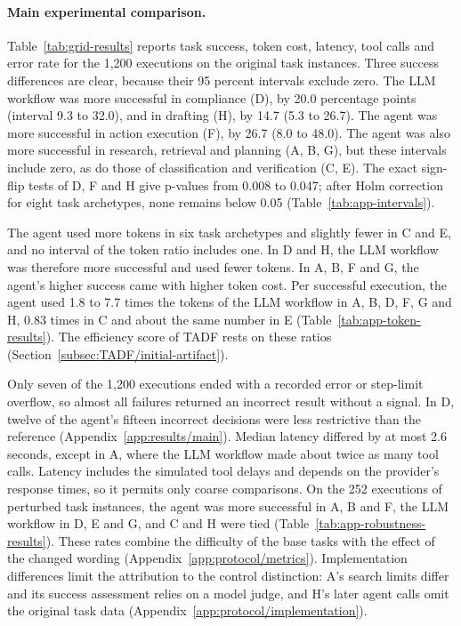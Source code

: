 \paragraph{Main experimental comparison.}
Table~\ref{tab:grid-results} reports task success, token cost, latency, tool calls and error rate for the 1,200 executions on the original task instances. Three success differences are clear, because their 95 percent intervals exclude zero. The LLM workflow was more successful in compliance (D), by 20.0 percentage points (interval 9.3 to 32.0), and in drafting (H), by 14.7 (5.3 to 26.7). The agent was more successful in action execution (F), by 26.7 (8.0 to 48.0). The agent was also more successful in research, retrieval and planning (A, B, G), but these intervals include zero, as do those of classification and verification (C, E). The exact sign-flip tests of D, F and H give p-values from 0.008 to 0.047; after Holm correction for eight task archetypes, none remains below 0.05 (Table~\ref{tab:app-intervals}).

The agent used more tokens in six task archetypes and slightly fewer in C and E, and no interval of the token ratio includes one. In D and H, the LLM workflow was therefore more successful and used fewer tokens. In A, B, F and G, the agent's higher success came with higher token cost. Per successful execution, the agent used 1.8 to 7.7 times the tokens of the LLM workflow in A, B, D, F, G and H, 0.83 times in C and about the same number in E (Table~\ref{tab:app-token-results}). The efficiency score of TADF rests on these ratios (Section~\ref{subsec:TADF/initial-artifact}).

Only seven of the 1,200 executions ended with a recorded error or step-limit overflow, so almost all failures returned an incorrect result without a signal. In D, twelve of the agent's fifteen incorrect decisions were less restrictive than the reference (Appendix~\ref{app:results/main}). Median latency differed by at most 2.6 seconds, except in A, where the LLM workflow made about twice as many tool calls. Latency includes the simulated tool delays and depends on the provider's response times, so it permits only coarse comparisons. On the 252 executions of perturbed task instances, the agent was more successful in A, B and F, the LLM workflow in D, E and G, and C and H were tied (Table~\ref{tab:app-robustness-results}). These rates combine the difficulty of the base tasks with the effect of the changed wording (Appendix~\ref{app:protocol/metrics}). Implementation differences limit the attribution to the control distinction: A's search limits differ and its success assessment relies on a model judge, and H's later agent calls omit the original task data (Appendix~\ref{app:protocol/implementation}).

